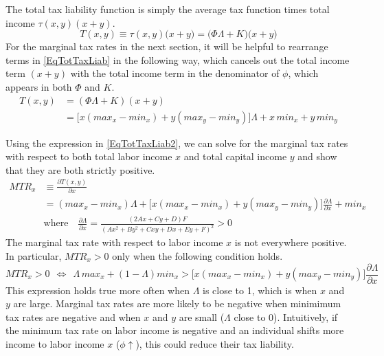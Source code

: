 \documentclass[letterpaper,12pt]{article}
\theoremstyle{definition}
\begin{document}
\begin{spacing}{1.5}
    The total tax liability function is simply the average tax function times total income $\tau(x,y)(x+y)$.
    \begin{equation}\label{EqTotTaxLiab}
      T(x,y) \equiv \tau(x,y)\bigl(x + y\bigr) = \bigl(\Phi\Lambda + K\bigr)\bigl(x + y\bigr)
    \end{equation}
    For the marginal tax rates in the next section, it will be helpful to rearrange terms in \eqref{EqTotTaxLiab} in the following way, which cancels out the total income term $(x+y)$ with the total income term in the denominator of $\phi$, which appears in both $\Phi$ and $K$.
    \begin{equation}\label{EqTotTaxLiab2}
      \begin{split}
        T(x,y) &= (\Phi\Lambda + K)(x+y) \\
        &= \bigl[x(max_x - min_x) + y(max_y - min_y)\bigr]\Lambda + x\,min_x + y\,min_y
      \end{split}
    \end{equation}

    Using the expression in \eqref{EqTotTaxLiab2}, we can solve for the marginal tax rates with respect to both total labor income $x$ and total capital income $y$ and show that they are both strictly positive.
    \begin{equation}\label{EqMTRx}
      \begin{split}
        MTR_x &\equiv \frac{\partial T(x,y)}{\partial x} \\
        &= (max_x - min_x)\Lambda + \bigl[x(max_x - min_x) + y(max_y - min_y)\bigr]\frac{\partial\Lambda}{\partial x} + min_x \\
        &\text{where}\quad \frac{\partial\Lambda}{\partial x} = \frac{(2Ax + Cy + D)F}{(Ax^2 + By^2 + Cxy + Dx + Ey + F)^2} > 0
      \end{split}
    \end{equation}
    The marginal tax rate with respect to labor income $x$ is not everywhere positive. In particular, $MTR_x>0$ only when the following condition holds.
    \begin{equation}\label{EqMTRxpos}
      MTR_x>0 \:\:\Leftrightarrow\:\: \Lambda\,max_x + (1 - \Lambda)min_x > \bigl[x(max_x - min_x) + y(max_y - min_y)\bigr]\frac{\partial\Lambda}{\partial x}
    \end{equation}
    This expression holds true more often when $\Lambda$ is close to 1, which is when $x$ and $y$ are large. Marginal tax rates are more likely to be negative when minimimum tax rates are negative and when $x$ and $y$ are small ($\Lambda$ close to 0). Intuitively, if the minimum tax rate on labor income is negative and an individual shifts more income to labor income $x$ ($\phi\uparrow$), this could reduce their tax liability.


\end{spacing}
\end{document}

